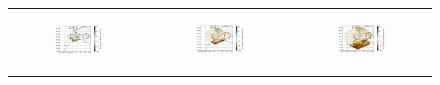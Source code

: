 \begin{figure}[htbp]
\begin{tabular}{ccc}
        \begin{subfigure}[b]{0.33\textwidth}
            \caption{}
            \includegraphics[width=\textwidth]{images/chap4/domain_size/rel_diff_map_evap_era_LAM_1000km_NBP40.png}
        \end{subfigure} &
        \begin{subfigure}[b]{0.33\textwidth}
            \caption{}
            \includegraphics[width=\textwidth]{images/chap4/domain_size/rel_diff_map_evap_era_LAM_1500km_NBP60.png}
        \end{subfigure} &
        \begin{subfigure}[b]{0.33\textwidth}
            \caption{}
            \includegraphics[width=\textwidth]{images/chap4/domain_size/rel_diff_map_evap_era_LAM_2000km_NBP80.png}

\end{subfigure}
\end{tabular}
\end{figure}
